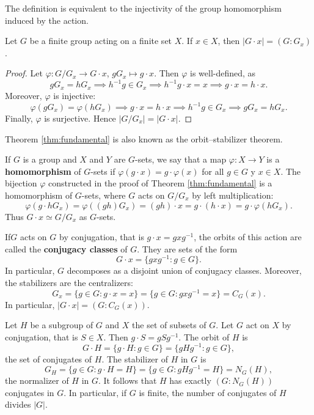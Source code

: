 The definition is equivalent to the injectivity of 
the group homomorphism induced
by the action. 

\begin{theorem}
\label{thm:fundamental}
Let $G$ be a finite group acting on a finite set $X$. If 
$x\in X$, then $|G\cdot x|=(G:G_x)$.
\end{theorem}

\begin{proof}
    Let $\varphi\colon G/G_x\to G\cdot x$, $gG_x\mapsto g\cdot x$. Then $\varphi$ is well-defined, as 
        \[
        gG_x=hG_x\implies h^{-1}g\in G_x
        \implies h^{-1}g\cdot x=x\implies g\cdot x=h\cdot x.
        \]
    Moreover, $\varphi$ is injective: 
        \[
        \varphi(gG_x)=\varphi(hG_x)\implies
        g\cdot x=h\cdot x\implies
        h^{-1}g\in G_x\implies gG_x=hG_x.
        \]
    Finally, $\varphi$ is surjective. Hence 
    $|G/G_x|=|G\cdot x|$.
\end{proof}

Theorem \ref{thm:fundamental} is also known 
as the orbit--stabilizer theorem. 

If $G$ is a group and $X$ and $Y$ are $G$-sets, 
we say that a map $\varphi\colon X\to Y$ is a 
\textbf{homomorphism} of $G$-sets if $\varphi(g\cdot x)=g\cdot \varphi(x)$ for all $g\in G$ y $x\in X$. The bijection 
$\varphi$ constructed in the proof of Theorem \ref{thm:fundamental}
is a homomorphism of $G$-sets, where
$G$ acts on $G/G_x$ by left multiplication: 
\[
\varphi(g\cdot hG_x)=\varphi((gh)G_x)=(gh)\cdot x=g\cdot (h\cdot x)=g\cdot\varphi(hG_x).
\]
Thus $G\cdot x\simeq G/G_x$ as $G$-sets.

\begin{example}
    If$G$ acts on $G$ by conjugation, that is $g\cdot x=gxg^{-1}$, the orbits of this action are called the \textbf{conjugacy classes} 
    of $G$. They are sets of the form
        \[
        G\cdot x=\{gxg^{-1}:g\in G\}.
        \]
    In particular, $G$ decomposes as a disjoint union of conjugacy classes. Moreover, 
    the stabilizers are the centralizers:
        \[
        G_x=\{g\in G:g\cdot x=x\}=\{g\in G:gxg^{-1}=x\}=C_G(x).
        \]
    In particular, $|G\cdot x|=(G:C_G(x))$.
\end{example}

\begin{example}
    Let $H$ be a subgroup of $G$ and $X$ the set of subsets of $G$. Let $G$ act on 
    $X$ by conjugation, that is $S\in X$. Then
        $g\cdot S=gSg^{-1}$. The orbit of $H$ 
        is 
        \[
        G\cdot H=\{g\cdot H:g\in G\}=\{gHg^{-1}:g\in G\},
        \]
        the set of conjugates of $H$. The stabilizer of $H$ in $G$ 
        is 
        \[
        G_H=\{g\in G:g\cdot H=H\}=\{g\in G:gHg^{-1}=H\}=N_G(H),
        \]
        the normalizer of $H$ in $G$. It follows that
        $H$ has exactly $(G:N_G(H))$ conjugates in $G$. In particular,
        if $G$ is finite, 
        the number of conjugates of $H$ divides $|G|$. 
\end{example}

